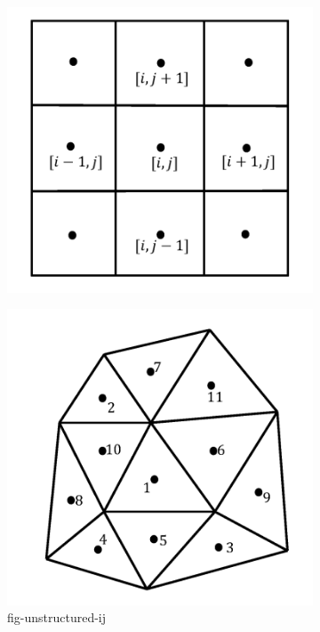 \begin{figure}
  \centering
  \begin{subfigure}{0.5\linewidth}
    \centering
    \includegraphics[width=0.8\linewidth]{img/intro/mStructured.png}
    \caption{}
    \label{fig-structured-ij}
  \end{subfigure}%
  \begin{subfigure}{0.5\linewidth}
    \centering
    \includegraphics[width=0.8\linewidth]{img/intro/mUnstructured.png}
    \caption{fig-unstructured-ij}
  \end{subfigure}%
  \caption{}
  \label{fig-structured-unstructured}
\end{figure}

